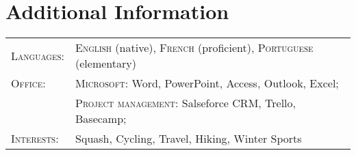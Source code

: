 \documentclass[a4paper,10pt]{article}
\begin{document}
\section{Additional Information}
\begin{supertabular}{p{3.4cm} p{13.9cm}}
	\textsc{Languages:}			& \small\textsc{English} (native), \textsc{French} (proficient), \textsc{Portuguese} (elementary) \vspace{1mm} \\

	\textsc{Office:}			& \small\textsc{Microsoft}: \footnotesize Word, PowerPoint, Access, Outlook, Excel; \\
								& \small\textsc{Project management:} \footnotesize Salseforce CRM, Trello, Basecamp; \vspace{1mm} \\

	\textsc{Interests:} 		& \small Squash, Cycling, Travel, Hiking, Winter Sports \\

\end{supertabular}
\end{document}
